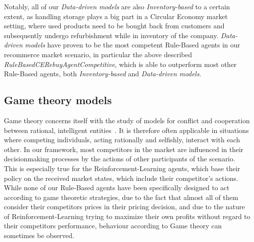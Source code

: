 Notably, all of our \emph{Data-driven models} are also \emph{Inventory-based} to a certain extent, as handling storage plays a big part in a Circular Economy market setting, where used products need to be bought back from customers and subsequently undergo refurbishment while in inventory of the company. \emph{Data-driven models} have proven to be the most competent Rule-Based agents in our recommerce market scenario, in particular the above described \emph{RuleBasedCERebuyAgentCompetitive}, which is able to outperform most other Rule-Based agents, both \emph{Inventory-based} and \emph{Data-driven models}.

\subsection*{Game theory models}\label{subsec:GameTheory}

Game theory concerns itself with the study of models for conflict and cooperation between rational, intelligent entities~\cite{GameTheory}. It is therefore often applicable in situations where competing individuals, acting rationally and selfishly, interact with each other. In our framework, most competitors in the market are influenced in their decisionmaking processes by the actions of other participants of the scenario. This is especially true for the Reinforcement-Learning agents, which base their policy on the received market states, which include their competitor's actions. While none of our Rule-Based agents have been specifically designed to act according to game theoretic strategies, due to the fact that almost all of them consider their competitors prices in their pricing decision, and due to the nature of Reinforcement-Learning trying to maximize their own profits without regard to their competitors performance, behaviour according to Game theory can sometimes be observed. 

